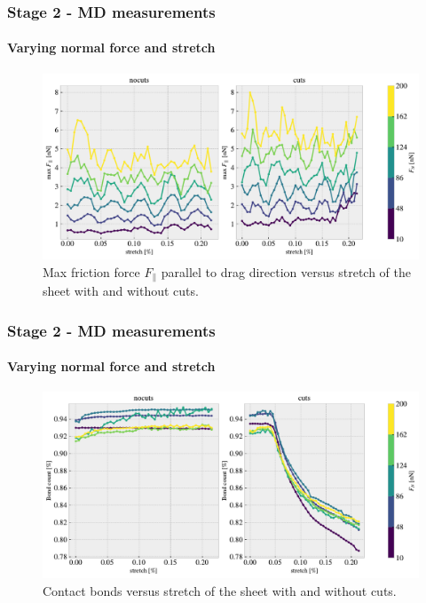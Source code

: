 \documentclass[
	10pt, %
]{beamer}
\begin{document}
\begin{frame}
	\frametitle{Stage 2 - MD measurements}
	\framesubtitle{Varying normal force and stretch}
	\begin{figure}
		\includegraphics[width=\linewidth]{figures/multi1.pdf}
		\caption{Max friction force $F_{\parallel}$ parallel to drag direction versus stretch of the sheet with and without cuts.}
	\end{figure}	
\end{frame}


\begin{frame}
	\frametitle{Stage 2 - MD measurements}
	\framesubtitle{Varying normal force and stretch}
	\begin{figure}
		\includegraphics[width=\linewidth]{figures/multi3.pdf}
		\caption{Contact bonds versus stretch of the sheet with and without cuts.}
	\end{figure}	
\end{frame}
\end{document}
